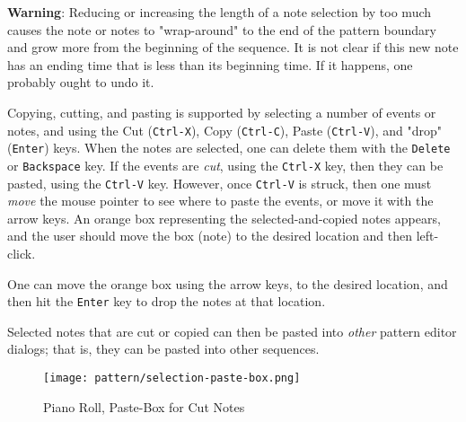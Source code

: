    \textbf{Warning}:  Reducing or increasing the length of a note selection
   by too much causes the note or notes to "wrap-around" to the end
   of the pattern boundary and grow more from the beginning of the sequence. 
   It is not clear if this new note has an ending time that is less than its
   beginning time.  If it happens, one probably ought to undo it.


   Copying, cutting, and pasting is supported by selecting a number of events
   or notes, and using the
    Cut (\texttt{Ctrl-X}), 
    Copy (\texttt{Ctrl-C}),
    Paste (\texttt{Ctrl-V}), and
   "drop" (\texttt{Enter})
   keys.
   When the notes are selected,
   one can delete them with the \texttt{Delete} or \texttt{Backspace} key.
   If the events are \textsl{cut}, using the \texttt{Ctrl-X} key, then
   they can be pasted, using the \texttt{Ctrl-V} key.  However,
   once \texttt{Ctrl-V} is struck, then one must \textsl{move} the mouse
   pointer to see where to paste the events, or move it with the arrow keys.
   An orange box representing the
   selected-and-copied notes appears, and the user should move the box (note)
   to the desired location and then left-click.


   One can move the orange box using the arrow keys, to the
   desired location, and then hit the
    \texttt{Enter} key to
   drop the notes at that location.

   Selected notes that are cut or copied can then be
   pasted into \textsl{other} pattern editor dialogs; that is, they can be
   pasted into other sequences.

\begin{figure}[H]
   \centering 
   \texttt{[image: pattern/selection-paste-box.png]}
   \caption{Piano Roll, Paste-Box for Cut Notes}
   \label{fig:pattern_editor_selection_paste_box}
\end{figure}
   
